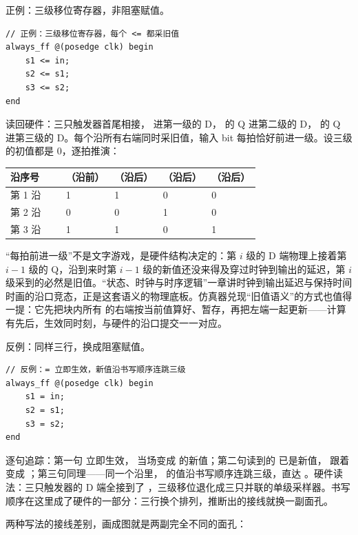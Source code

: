 正例：三级移位寄存器，非阻塞赋值。

\begin{lstlisting}
// 正例：三级移位寄存器，每个 <= 都采旧值
always_ff @(posedge clk) begin
    s1 <= in;
    s2 <= s1;
    s3 <= s2;
end
\end{lstlisting}

读回硬件：三只触发器首尾相接， 进第一级的 D， 的 Q 进第二级的 D， 的 Q 进第三级的 D。每个沿所有右端同时采旧值，输入 bit 每拍恰好前进一级。设三级的初值都是 0，逐拍推演：

\begin{longtable}{L{0.16\linewidth}L{0.14\linewidth}L{0.14\linewidth}L{0.14\linewidth}L{0.14\linewidth}}
\toprule
沿序号 & （沿前） & （沿后） & （沿后） & （沿后） \\
\midrule
第 1 沿 & 1 & 1 & 0 & 0 \\\tablerowrule
第 2 沿 & 0 & 0 & 1 & 0 \\\tablerowrule
第 3 沿 & 1 & 1 & 0 & 1 \\
\bottomrule
\end{longtable}

“每拍前进一级”不是文字游戏，是硬件结构决定的：第 $i$ 级的 D 端物理上接着第 $i-1$ 级的 Q，沿到来时第 $i-1$ 级的新值还没来得及穿过时钟到输出的延迟，第 $i$ 级采到的必然是旧值。“状态、时钟与时序逻辑”一章讲时钟到输出延迟与保持时间时画的沿口竞态，正是这套语义的物理底板。仿真器兑现“旧值语义”的方式也值得一提：它先把块内所有 \code{<=} 的右端按当前值算好、暂存，再把左端一起更新——计算有先后，生效同时刻，与硬件的沿口提交一一对应。

反例：同样三行，换成阻塞赋值。

\begin{lstlisting}
// 反例：= 立即生效，新值沿书写顺序连跳三级
always_ff @(posedge clk) begin
    s1 = in;
    s2 = s1;
    s3 = s2;
end
\end{lstlisting}

逐句追踪：第一句  立即生效， 当场变成  的新值；第二句读到的  已是新值， 跟着变成 ；第三句同理——同一个沿里， 的值沿书写顺序连跳三级，直达 。硬件读法：三只触发器的 D 端全接到了 ，三级移位退化成三只并联的单级采样器。书写顺序在这里成了硬件的一部分：三行换个排列，推断出的接线就换一副面孔。

两种写法的接线差别，画成图就是两副完全不同的面孔：

